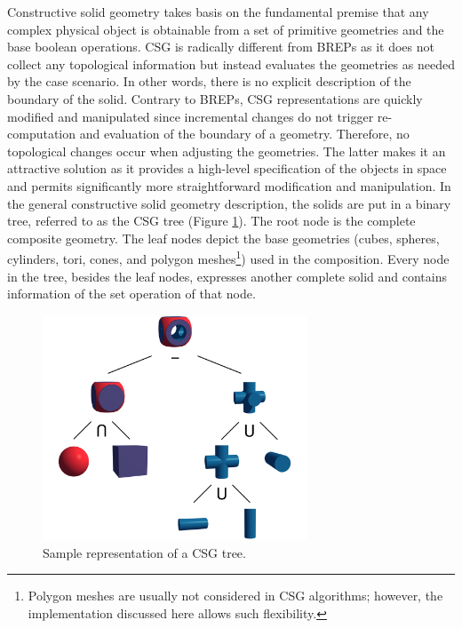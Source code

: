 \documentclass[a4paper,11pt,oneside]{article}
\begin{document}
Constructive solid geometry takes basis on the fundamental premise that any complex physical object is obtainable from a set of primitive geometries and the base boolean operations. CSG is radically different from BREPs as it does not collect any topological information but instead evaluates the geometries as needed by the case scenario. In other words, there is no explicit description of the boundary of the solid. Contrary to BREPs,  CSG representations are quickly modified and manipulated since incremental changes do not trigger re-computation and evaluation of the boundary of a geometry. Therefore, no topological changes occur when adjusting the geometries. The latter makes it an attractive solution as it provides a high-level specification of the objects in space and permits significantly more straightforward modification and manipulation. In the general constructive solid geometry description, the solids are put in a binary tree, referred to as the CSG tree (Figure \ref{sec3.1:sample-csg-tree}). The root node is the complete composite geometry. The leaf nodes depict the base geometries (cubes, spheres, cylinders, tori, cones, and polygon meshes\footnote{Polygon meshes are usually not considered in CSG algorithms; however, the implementation discussed here allows such flexibility.}) used in the composition. Every node in the tree, besides the leaf nodes, expresses another complete solid and contains information of the set operation of that node.

\begin{figure}[ht]
	\begin{center}
		\includegraphics[width=0.7\textwidth]{section1/sample-csg-tree.png}
	\end{center}
	\caption{Sample representation of a CSG tree.}
	\label{sec3.1:sample-csg-tree}
\end{figure}
  
\end{document}
